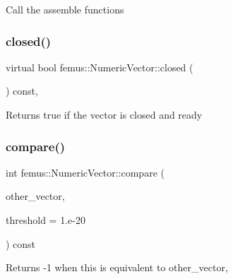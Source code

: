 Call the assemble functions \mbox{\label{classfemus_1_1_numeric_vector_a34f55bd075ab087a8b6c2d10fe962f0a}} 
\subsubsection{\texorpdfstring{closed()}{closed()}}
{\footnotesize\ttfamily virtual bool femus\+::\+Numeric\+Vector\+::closed (\begin{DoxyParamCaption}{ }\end{DoxyParamCaption}) const\hspace{0.3cm}{\ttfamily [inline]}, {\ttfamily [virtual]}}

\begin{DoxyReturn}{Returns}
true if the vector is closed and ready 
\end{DoxyReturn}
\mbox{\label{classfemus_1_1_numeric_vector_a692068ac78adf8745fa5ba7a2efd7189}} 
\subsubsection{\texorpdfstring{compare()}{compare()}}
{\footnotesize\ttfamily int femus\+::\+Numeric\+Vector\+::compare (\begin{DoxyParamCaption}\item[{const \mbox{\hyperlink{classfemus_1_1_numeric_vector}{Numeric\+Vector}} \&}]{other\+\_\+vector,  }\item[{const double}]{threshold = {\ttfamily 1.e-\/20} }\end{DoxyParamCaption}) const\hspace{0.3cm}{\ttfamily [virtual]}}

\begin{DoxyReturn}{Returns}
{\ttfamily -\/1} when {\ttfamily this} is equivalent to {\ttfamily other\+\_\+vector}, 
\end{DoxyReturn}
\mbox{\label{classfemus_1_1_numeric_vector_aabe0286e4e88ef9c2c8a8ea5442ea511}} 
